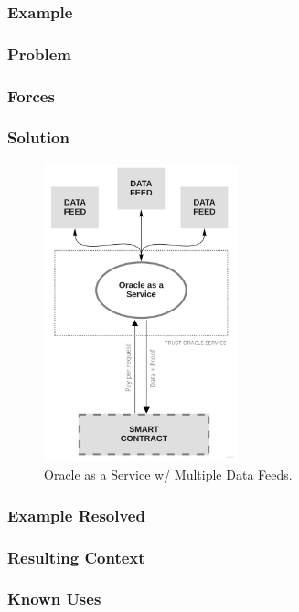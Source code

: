 \subsubsection{Example}
\subsubsection{Problem}
\subsubsection{Forces}
\subsubsection{Solution}
\begin{figure}[t]
  \begin{center}
    \leavevmode
    \includegraphics[width=0.5\textwidth]{figures/oraclearch2.jpg}
    \caption{Oracle as a Service w/ Multiple Data Feeds.}
    \label{fig:/figures/paper-screening}
  \end{center}
\end{figure}

\subsubsection{Example Resolved}
\subsubsection{Resulting Context}
\subsubsection{Known Uses}

